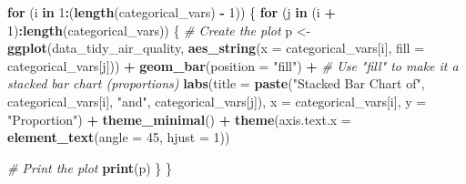\documentclass[12pt,halfline,a4paper,]{ouparticle}
\newenvironment{Shaded}{\begin{snugshade}}{\end{snugshade}}
\newcommand{\AttributeTok}[1]{\textcolor[rgb]{0.13,0.29,0.53}{#1}}
\newcommand{\CommentTok}[1]{\textcolor[rgb]{0.56,0.35,0.01}{\textit{#1}}}
\newcommand{\ControlFlowTok}[1]{\textcolor[rgb]{0.13,0.29,0.53}{\textbf{#1}}}
\newcommand{\DecValTok}[1]{\textcolor[rgb]{0.00,0.00,0.81}{#1}}
\newcommand{\FunctionTok}[1]{\textcolor[rgb]{0.13,0.29,0.53}{\textbf{#1}}}
\newcommand{\NormalTok}[1]{#1}
\newcommand{\OtherTok}[1]{\textcolor[rgb]{0.56,0.35,0.01}{#1}}
\newcommand{\SpecialCharTok}[1]{\textcolor[rgb]{0.81,0.36,0.00}{\textbf{#1}}}
\newcommand{\StringTok}[1]{\textcolor[rgb]{0.31,0.60,0.02}{#1}}
\begin{document}
\begin{Shaded}
\begin{Highlighting}[]
\ControlFlowTok{for}\NormalTok{ (i }\ControlFlowTok{in} \DecValTok{1}\SpecialCharTok{:}\NormalTok{(}\FunctionTok{length}\NormalTok{(categorical\_vars) }\SpecialCharTok{{-}} \DecValTok{1}\NormalTok{)) \{}
  \ControlFlowTok{for}\NormalTok{ (j }\ControlFlowTok{in}\NormalTok{ (i }\SpecialCharTok{+} \DecValTok{1}\NormalTok{)}\SpecialCharTok{:}\FunctionTok{length}\NormalTok{(categorical\_vars)) \{}
    \CommentTok{\# Create the plot}
\NormalTok{    p }\OtherTok{\textless{}{-}} \FunctionTok{ggplot}\NormalTok{(data\_tidy\_air\_quality, }\FunctionTok{aes\_string}\NormalTok{(}\AttributeTok{x =}\NormalTok{ categorical\_vars[i], }\AttributeTok{fill =}\NormalTok{ categorical\_vars[j])) }\SpecialCharTok{+}
      \FunctionTok{geom\_bar}\NormalTok{(}\AttributeTok{position =} \StringTok{"fill"}\NormalTok{) }\SpecialCharTok{+}  \CommentTok{\# Use "fill" to make it a stacked bar chart (proportions)}
      \FunctionTok{labs}\NormalTok{(}\AttributeTok{title =} \FunctionTok{paste}\NormalTok{(}\StringTok{"Stacked Bar Chart of"}\NormalTok{, categorical\_vars[i], }\StringTok{"and"}\NormalTok{, categorical\_vars[j]),}
           \AttributeTok{x =}\NormalTok{ categorical\_vars[i],}
           \AttributeTok{y =} \StringTok{"Proportion"}\NormalTok{) }\SpecialCharTok{+}
      \FunctionTok{theme\_minimal}\NormalTok{() }\SpecialCharTok{+}
      \FunctionTok{theme}\NormalTok{(}\AttributeTok{axis.text.x =} \FunctionTok{element\_text}\NormalTok{(}\AttributeTok{angle =} \DecValTok{45}\NormalTok{, }\AttributeTok{hjust =} \DecValTok{1}\NormalTok{))}
    
    \CommentTok{\# Print the plot}
    \FunctionTok{print}\NormalTok{(p)}
\NormalTok{  \}}
\NormalTok{\}}
\end{Highlighting}
\end{Shaded}
\end{document}
